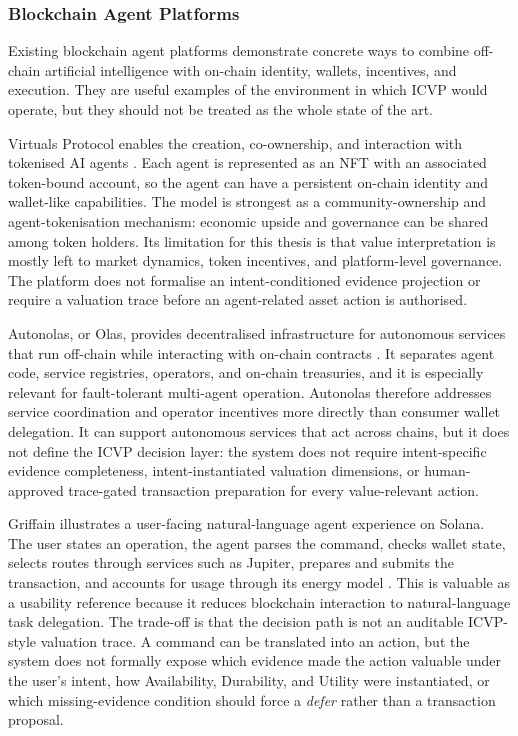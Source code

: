 \subsubsection{Blockchain Agent Platforms}

Existing blockchain agent platforms demonstrate concrete ways to combine
off-chain artificial intelligence with on-chain identity, wallets, incentives,
and execution. They are useful examples of the environment in which ICVP would
operate, but they should not be treated as the whole state of the art.

Virtuals Protocol enables the creation, co-ownership, and interaction with
tokenised AI agents \cite{VirtualsWhitepaper2024}. Each agent is represented as
an NFT with an associated token-bound account, so the agent can have a persistent
on-chain identity and wallet-like capabilities. The model is strongest as a
community-ownership and agent-tokenisation mechanism: economic upside and
governance can be shared among token holders. Its limitation for this thesis is
that value interpretation is mostly left to market dynamics, token incentives,
and platform-level governance. The platform does not formalise an
intent-conditioned evidence projection or require a valuation trace before an
agent-related asset action is authorised.

Autonolas, or Olas, provides decentralised infrastructure for autonomous
services that run off-chain while interacting with on-chain contracts
\cite{AICoin2023, OlasNetwork2024}. It separates agent code, service registries,
operators, and on-chain treasuries, and it is especially relevant for
fault-tolerant multi-agent operation. Autonolas therefore addresses service
coordination and operator incentives more directly than consumer wallet
delegation. It can support autonomous services that act across chains, but it
does not define the ICVP decision layer: the system does not require
intent-specific evidence completeness, intent-instantiated valuation dimensions,
or human-approved trace-gated transaction preparation for every value-relevant
action.

Griffain illustrates a user-facing natural-language agent experience on Solana.
The user states an operation, the agent parses the command, checks wallet state,
selects routes through services such as Jupiter, prepares and submits the
transaction, and accounts for usage through its energy model \cite{Griffain2024}.
This is valuable as a usability reference because it reduces blockchain
interaction to natural-language task delegation. The trade-off is that the
decision path is not an auditable ICVP-style valuation trace. A command can be
translated into an action, but the system does not formally expose which
evidence made the action valuable under the user's intent, how Availability,
Durability, and Utility were instantiated, or which missing-evidence condition
should force a \textit{defer} rather than a transaction proposal.

